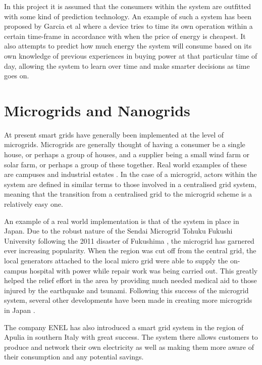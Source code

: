 \documentclass[a4paper, notitlepage]{report}
\begin{document}
In this project it is assumed that the consumers within the system are outfitted
with some kind of prediction technology. An example of such a system has been
proposed by Garcia et al \cite{mohsenian2010optimal} where a device tries to time
its own operation within a certain time-frame in accordance with when the price
of energy is cheapest. It also attempts to predict how much energy the system
will consume based on its own knowledge of previous experiences in buying power
at that particular time of day, allowing the system to learn over time and make
smarter decisions as time goes on. 
\section{Microgrids and Nanogrids}
\label{sec:org5d59bdb}
At present smart grids have generally been implemented at the level of
microgrids. Microgrids are generally thought of having a consumer be a single
house, or perhaps a group of houses, and a supplier being a small wind farm or
solar farm, or perhaps a group of these together. Real world examples of these
are campuses and industrial estates \cite{markvart2006microgrids}. In the case of
a microgrid, actors within the system are defined in similar terms to those
involved in a centralised grid system, meaning that the transition from a
centralised grid to the microgrid scheme is a relatively easy one.

An example of a real world implementation is that of the system in place in
Japan. Due to the robust nature of the Sendai Microgrid Tohuku Fukushi
University following the 2011 disaster of Fukushima \cite{hirose2013sendai}, the
microgrid has garnered ever increasing popularity. When the region was cut off
from the central grid, the local generators attached to the local micro grid
were able to supply the on-campus hospital with power while repair work was
being carried out. This greatly helped the relief effort in the area by
providing much needed medical aid to those injured by the earthquake and
tsunami. Following this success of the microgrid system, several other
developments have been made in creating more microgrids in Japan
\cite{japan_microgrids}. 

The company ENEL has also introduced a smart grid system in the region of Apulia
in southern Italy \cite{sapienza2013enel} with great success. The system there
allows customers to produce and network their own electricity as well as making
them more aware of their consumption and any potential savings.
\end{document}
